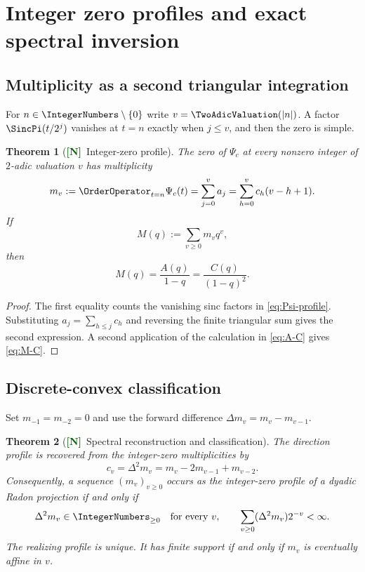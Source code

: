 \documentclass[11pt]{article}
\numberwithin{equation}{section}
\newtheorem{theorem}{Theorem}[section]
\theoremstyle{definition}
\theoremstyle{remark}
\newcommand{\New}{\textcolor{darkgreen}{\textsf{\textbf{[N]}}}}
\begin{document}
\section{Integer zero profiles and exact spectral inversion}
\label{sec:zero-profile}

\subsection{Multiplicity as a second triangular integration}

For $n\in\IntegerNumbers\setminus\{0\}$ write $v=\TwoAdicValuation(|n|)$.  A factor
$\SincPi(t/2^j)$ vanishes at $t=n$ exactly when $j\le v$, and then the zero is
simple.

\begin{theorem}[\New\ Integer-zero profile]
\label{thm:zero-profile}
The zero of $\Psi_c$ at every nonzero integer of $2$-adic valuation $v$ has
multiplicity
\begin{equation}
 m_v:=\OrderOperator_{t=n}\Psi_c(t)
 =\sum_{j=0}^{v}a_j
 =\sum_{h=0}^{v}c_h(v-h+1).
 \label{eq:m-profile}
\end{equation}
If
\begin{equation}
 M(q):=\sum_{v\ge0}m_vq^v,
 \label{eq:M-generating}
\end{equation}
then
\begin{equation}
 M(q)=\frac{A(q)}{1-q}=\frac{C(q)}{(1-q)^2}.
 \label{eq:M-C}
\end{equation}
\end{theorem}

\begin{proof}
The first equality counts the vanishing sinc factors in
\eqref{eq:Psi-profile}.  Substituting $a_j=\sum_{h\le j}c_h$ and reversing the
finite triangular sum gives the second expression.  A second application of
the calculation in \eqref{eq:A-C} gives \eqref{eq:M-C}.
\end{proof}

\subsection{Discrete-convex classification}

Set $m_{-1}=m_{-2}=0$ and use the forward difference
$\Delta m_v=m_v-m_{v-1}$.

\begin{theorem}[\New\ Spectral reconstruction and classification]
\label{thm:classification}
The direction profile is recovered from the integer-zero multiplicities by
\begin{equation}
 \boxed{\ c_v=\Delta^2m_v=m_v-2m_{v-1}+m_{v-2}.\ }
 \label{eq:second-difference-inversion}
\end{equation}
Consequently, a sequence $(m_v)_{v\ge0}$ occurs as the integer-zero profile of
a dyadic Radon projection if and only if
\begin{equation}
 \Delta^2m_v\in\IntegerNumbers_{\ge0}
 \quad\text{for every }v,
 \qquad
 \sum_{v\ge0}(\Delta^2m_v)2^{-v}<\infty.
 \label{eq:classification-conditions}
\end{equation}
The realizing profile is unique.  It has finite support if and only if $m_v$
is eventually affine in $v$.
\end{theorem}
\end{document}
